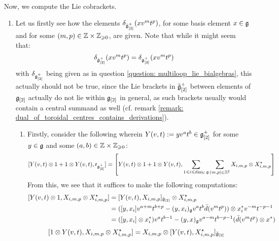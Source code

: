 \begin{remark}
                Now, we compute the Lie cobrackets.
                \begin{enumerate}
                    \item Let us firstly see how the elements $\delta_{\hat{\g}_{[2]}^+}(x v^m t^p)$, for some basis element $x \in \g$ and for some $(m, p) \in \Z \x \Z_{\geq 0}$, are given. Note that while it might seem that:
                        $$\delta_{\hat{\g}_{[2]}^+}(x v^m t^p) = \delta_{\g_{[2]}^+}(x v^m t^p)$$
                    with $\delta_{\g_{[2]}^+}$ being given as in question \ref{question: multiloop_lie_bialgebras}, this actually should not be true, since the Lie brackets in $\tilde{\g}_{[2]}^+$ between elements of $\g_{[2]}$ actually do not lie within $\g_{[2]}$ in general, as such brackets usually would contain a central summand as well (cf. remark \ref{remark: dual_of_toroidal_centres_contains_derivations}).  
                    \begin{enumerate}
                        \item Firstly, consider the following wherein $Y(v, t) := y v^a t^b \in \g_{[2]}^+$ for some $y \in \g$ and some $(a, b) \in \Z \x \Z_{\geq 0}$:
                            $$[ Y(v, t) \tensor 1 + 1 \tensor Y(v, t), \sfr_{ \g_{[2]}^+ }] = \left[ Y(v, t) \tensor 1 + 1 \tensor Y(v, t), \sum_{1 \leq i \leq \dim_{\bbC} \g} \sum_{(m, p) \in \Z^2} X_{i, m, p} \tensor X_{i, m, p}^{\star} \right]$$
                        From this, we see that it suffices to make the following computations:
                            $$
                                \begin{aligned}
                                    [ Y(v, t) \tensor 1, X_{i, m, p} \tensor X_{i, m, p}^{\star} ] & = [Y(v, t), X_{i, m, p}]_{\tilde{\g}_{[2]}} \tensor X_{i, m, p}^{\star}
                                    \\
                                    & = ( [y, x_i] v^{a + m} t^{b + p} - (y, x_i)_{\g} v^a t^b \bar{d}(v^m t^p) ) \tensor x_i^* v^{-m} t^{-p - 1}
                                    \\
                                    & = ( [y, x_i] \tensor x_i^* ) v^a t^{b - 1} - (y, x)_{\g} v^{a - m} t^{b - p - 1} ( \bar{d}(v^m t^p) \tensor x^* )
                                \end{aligned}
                            $$
                            $$
                                \begin{aligned}
                                    [ 1 \tensor Y(v, t), X_{i, m, p} \tensor X_{i, m, p}^{\star} ] & = X_{i, m, p} \tensor [Y(v, t), X_{i, m, p}^{\star}]_{\tilde{\g}_{[2]}}

\end{aligned}$$
\end{enumerate}
\end{enumerate}
\end{remark}
